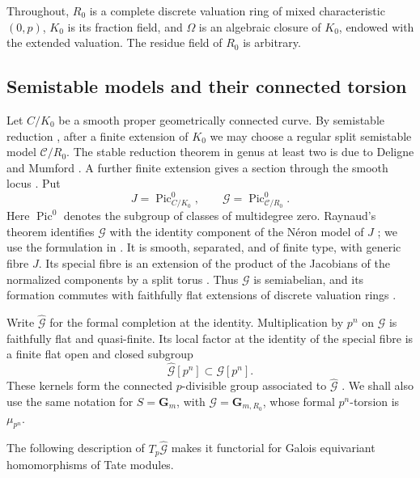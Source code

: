 \documentclass[11pt,a4paper]{article}
\numberwithin{equation}{section}
\theoremstyle{plain}
\theoremstyle{definition}
\theoremstyle{remark}
\renewcommand{\S}{\ensuremath{\mathsection}}
\begin{document}
Throughout, $R_0$ is a complete discrete valuation ring of mixed
characteristic $(0,p)$, $K_0$ is its fraction field, and $\Omega$ is an
algebraic closure of $K_0$, endowed with the extended valuation.  The
residue field of $R_0$ is arbitrary.

\subsection{Semistable models and their connected torsion}

Let $C/K_0$ be a smooth proper geometrically connected curve.  By
semistable reduction \cite[\S9.2, Theorem~7]{BLR1990}, after a finite
extension of $K_0$ we may choose a regular split semistable model
$\mathcal C/R_0$.  The stable reduction theorem in genus at least two is
due to Deligne and Mumford \cite[Corollary~2.7]{DeligneMumford1969}.
A further finite extension gives a section through the smooth locus
\cite[\S2.3, Proposition~5]{BLR1990}.  Put
\[
 J=\operatorname{Pic}^0_{C/K_0},\qquad
 \mathcal G=\operatorname{Pic}^0_{\mathcal C/R_0}.
\]
Here $\operatorname{Pic}^0$ denotes the subgroup of classes of
multidegree zero.  Raynaud's theorem identifies $\mathcal G$ with the
identity component of the N\'eron model of $J$
\cite[Th\'eor\`emes~8.1.4(b) and~8.2.1]{Raynaud1970}; we use the
formulation in \cite[\S9.5, Theorem~4(b) and Remark~5]{BLR1990}.
It is smooth,
separated, and of finite type, with generic fibre $J$.  Its special fibre
is an extension of the product of the Jacobians of the normalized
components by a split torus
\cite[\S9.2, Example~8]{BLR1990}.
Thus $\mathcal G$ is semiabelian, and its formation commutes with
faithfully flat extensions of discrete valuation rings
\cite[\S7.4, Corollary~4]{BLR1990}.

Write $\widehat{\mathcal G}$ for the formal completion at the identity.
Multiplication by $p^n$ on $\mathcal G$ is faithfully flat and
quasi-finite.  Its local factor at the identity of the special fibre is a
finite flat open and closed subgroup
\[
 \widehat{\mathcal G}[p^n]\subset\mathcal G[p^n].
\]
These kernels form the connected $p$-divisible group associated to
$\widehat{\mathcal G}$
\cite[\S2.2, Proposition~1]{Tate1967}.  We shall also use the same
notation for $S=\mathbf G_m$, with $\mathcal G=\mathbf G_{m,R_0}$,
whose formal $p^n$-torsion is $\mu_{p^n}$.

The following description of $T_p\widehat{\mathcal G}$ makes it
functorial for Galois equivariant homomorphisms of Tate modules.
\end{document}

